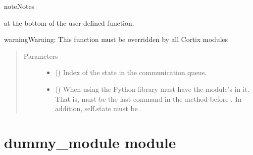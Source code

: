 \documentclass[letterpaper,10pt,openany,oneside,english]{sphinxmanual}
\begin{document}
\begin{fulllineitems}
\begin{fulllineitems}
\begin{sphinxadmonition}{note}{Notes}
\begin{quote}
\begin{description}
\end{description}
\end{quote}

at the bottom of the user defined  function.
\end{sphinxadmonition}

\begin{sphinxadmonition}{warning}{Warning:}
This function must be overridden by all Cortix modules
\end{sphinxadmonition}
\begin{quote}\begin{description}
\item[{Parameters}] \leavevmode\begin{itemize}
\item {} 
\sphinxstyleliteralstrong{\sphinxupquote{{[}}}\sphinxstyleliteralstrong{\sphinxupquote{{]}}} () \textendash{} Index of the state in the communication queue.

\item {} 
\sphinxstyleliteralstrong{\sphinxupquote{{[}}}\sphinxstyleliteralstrong{\sphinxupquote{{]}}} () \textendash{} When using the Python  library  must have
the module’s  in it. That is,
 must be the last command in the
method before . In addition, self.state must be .

\end{itemize}

\end{description}\end{quote}

\end{fulllineitems}


\end{fulllineitems}



\section{dummy\_module module}
\label{\detokenize{examples_rst/dummy_module:module-dummy_module}}\label{\detokenize{examples_rst/dummy_module:dummy-module-module}}\label{\detokenize{examples_rst/dummy_module::doc}}
\end{document}
